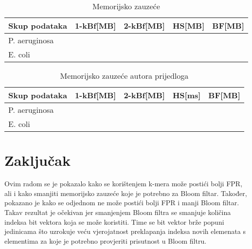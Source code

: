 \documentclass[times, utf8, seminar, numeric]{fer}
\begin{document}
\begin{table}[H]
  \centering
  \caption{Memorijsko zauzeće}
  \begin{tabular}{|| p{2.7cm} | p{2cm} | p{2cm} | p{2cm} | p{2cm} ||}
    \hline
    Skup podataka & 1-kBf[MB] & 2-kBf[MB] & HS[MB] & BF[MB]\\
    \hline\hline
    P. aeruginosa & & & &\\
    \hline
    E. coli & & & &\\
    \hline
  \end{tabular}
\end{table}

\begin{table}[H]
  \centering
  \caption{Memorijsko zauzeće autora prijedloga}
  \begin{tabular}{|| p{2.7cm} | p{2cm} | p{2cm} | p{2cm} | p{2cm} ||}
    \hline
    Skup podataka & 1-kBf[MB] & 2-kBf[MB] & HS[ms] & BF[MB]\\
    \hline\hline
    P. aeruginosa & & & &\\
    \hline
    E. coli & & & &\\
    \hline
  \end{tabular}
\end{table}

\chapter{Zaključak}
Ovim radom se je pokazalo kako se korištenjem k-mera može postići bolji FPR, ali
i kako smanjiti memorijsko zauzeće koje je potrebno za Bloom filtar. Također,
pokazano je kako se odjednom ne može postići bolji FPR i manji Bloom filtar. Takav
rezultat je očekivan jer smanjenjem Bloom filtra se smanjuje količina indeksa
bit vektora koja se može koristiti. Time se bit vektor brže popuni jedinicama što
uzrokuje veću vjerojatnost preklapanja indeksa novih elemenata s elementima za koje
je potrebno provjeriti prisutnost u Bloom filtru.

% 
% 


\end{document}

